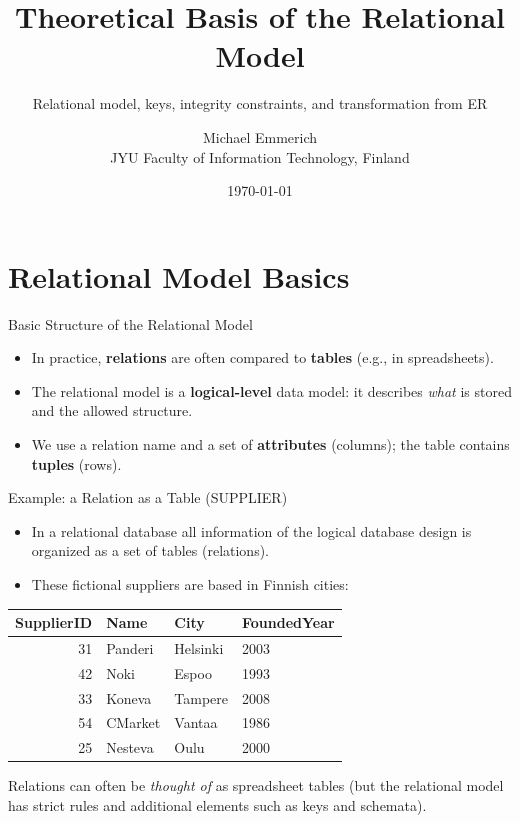 \documentclass[10pt,aspectratio=169]{beamer}
\title{Theoretical Basis of the Relational Model}
\subtitle{Relational model, keys, integrity constraints, and transformation from ER}
\author{Michael Emmerich\\JYU Faculty of Information Technology, Finland}
\date{\today}
\begin{document}
\begin{frame}
  \titlepage
\end{frame}

\section{Relational Model Basics}

\begin{frame}{Basic Structure of the Relational Model}
\begin{itemize}
  \item In practice, \textbf{relations} are often compared to \textbf{tables} (e.g., in spreadsheets).
  \item The relational model is a \textbf{logical-level} data model: it describes \emph{what} is stored and the allowed structure.
  \item We use a relation name and a set of \textbf{attributes} (columns); the table contains \textbf{tuples} (rows).
\end{itemize}
\end{frame}

\begin{frame}{Example: a Relation as a Table (SUPPLIER)}

\begin{itemize}
    \item In a relational database all information of the logical database design is organized as a set of tables (relations). \\
    \item These fictional suppliers are based in Finnish cities:\\
\end{itemize}
\centering
\begin{tabular}{@{}rlll@{}}
\toprule
\textbf{SupplierID} & \textbf{Name} & \textbf{City} & \textbf{FoundedYear}\\
\midrule
31 & Panderi & Helsinki & 2003\\
42 & Noki     & Espoo & 1993\\
33 & Koneva     & Tampere & 2008\\
54 & CMarket     & Vantaa & 1986\\
25 & Nesteva      & Oulu & 2000\\
\bottomrule
\end{tabular}

\vspace{1mm}
{Relations can often be \emph{thought of} as spreadsheet tables 
(but the relational model has strict rules and additional elements such as keys and schemata).}
\end{frame}
\end{document}
